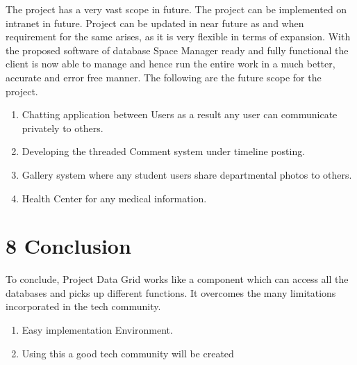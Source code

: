 \documentclass{standalone}
\begin{document}
The project has a very vast scope in future. The project can be implemented on intranet in future. Project can be updated in near future as and when requirement for the same arises, as it is very flexible in terms of expansion. With the proposed software of database Space Manager ready and fully functional the client is now able to manage and hence run the entire work in a much better, accurate and error free manner. The following are the future scope for the project.\vspace{0.7cm}

\begin{enumerate}

\item Chatting application between Users as a result any user can communicate privately to others.
\item Developing the threaded Comment system under timeline posting.
\item Gallery system where any student users share departmental photos to others.
\item Health Center for any medical information.\vspace{0.6cm}

\end{enumerate}

\let\clearpage\relax\chapter*{8\hspace{0.3 cm} Conclusion}
 \vspace{0.6cm}

To conclude, Project Data Grid works like a component which can access all the databases and picks up different functions. It overcomes the many limitations incorporated in the tech community.\vspace{0.6cm}

\begin{enumerate}

\item Easy implementation Environment.
\item Using this a good tech community will be created

\end{enumerate}
\end{document}
